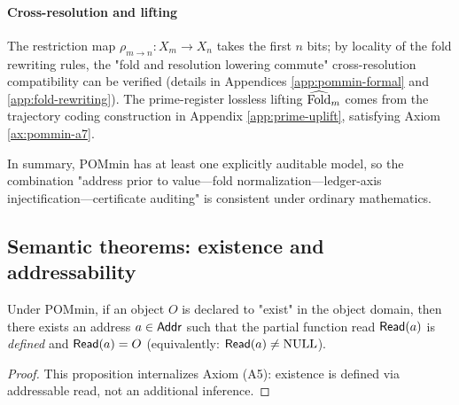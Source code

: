 \paragraph{Cross-resolution and lifting}
The restriction map $\rho_{m\to n}:X_m\to X_n$ takes the first $n$ bits; by locality of the fold rewriting rules, the "fold and resolution lowering commute" cross-resolution compatibility can be verified (details in Appendices \ref{app:pommin-formal} and \ref{app:fold-rewriting}). The prime-register lossless lifting $\widehat{\mathrm{Fold}}_m$ comes from the trajectory coding construction in Appendix \ref{app:prime-uplift}, satisfying Axiom \ref{ax:pommin-a7}.\par

In summary, POMmin has at least one explicitly auditable model, so the combination "address prior to value—fold normalization—ledger-axis injectification—certificate auditing" is consistent under ordinary mathematics.\par

\subsection{Semantic theorems: existence and addressability}
\begin{proposition}\label{prop:existence-semantics}
Under POMmin, if an object $O$ is declared to "exist" in the object domain, then there exists an address $a\in\mathsf{Addr}$ such that the partial function read $\mathsf{Read}(a)$ is \emph{defined} and $\mathsf{Read}(a)=O$ (equivalently: $\mathsf{Read}(a)\neq \mathrm{NULL}$).\par
\end{proposition}

\begin{proof}
This proposition internalizes Axiom (A5): existence is defined via addressable read, not an additional inference.\par
\end{proof}
